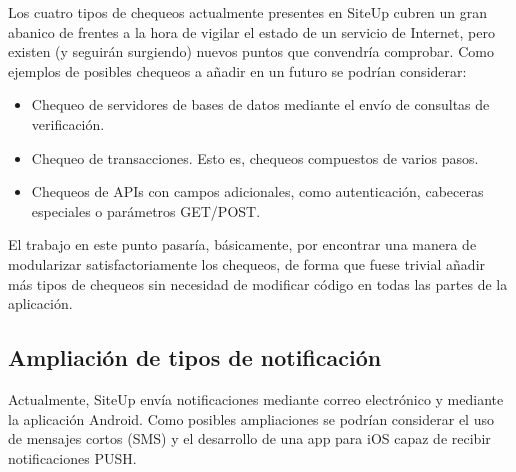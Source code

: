 Los cuatro tipos de chequeos actualmente presentes en SiteUp cubren un gran
abanico de frentes a la hora de vigilar el estado de un servicio de Internet,
pero existen (y seguirán surgiendo) nuevos puntos que convendría comprobar. Como
ejemplos de posibles chequeos a añadir en un futuro se podrían considerar:

\begin{itemize}
\item Chequeo de servidores de bases de datos mediante el envío de consultas de
  verificación.
\item Chequeo de transacciones. Esto es, chequeos compuestos de varios pasos.
\item Chequeos de APIs con campos adicionales, como autenticación, cabeceras
  especiales o parámetros GET/POST.
\end{itemize}

El trabajo en este punto pasaría, básicamente, por encontrar una manera de
modularizar satisfactoriamente los chequeos, de forma que fuese trivial añadir
más tipos de chequeos sin necesidad de modificar código en todas las partes de
la aplicación.

\subsection{Ampliación de tipos de notificación}

Actualmente, SiteUp envía notificaciones mediante correo electrónico y mediante
la aplicación Android. Como posibles ampliaciones se podrían considerar el uso
de mensajes cortos (SMS) y el desarrollo de una app para iOS capaz de recibir
notificaciones PUSH.

